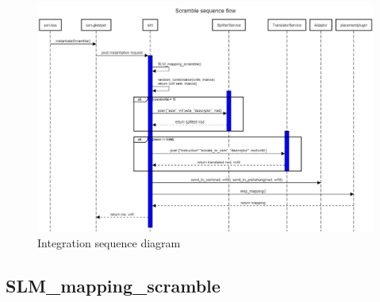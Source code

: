 \begin{figure}[H]
	\centering
	\includegraphics[width=1\linewidth]{"figures/scramble_seq_diag"}
	\caption{Integration sequence diagram}
	\label{fig:sequence-diagram-scramble}
\end{figure}

\subsection{SLM\_mapping\_scramble}

